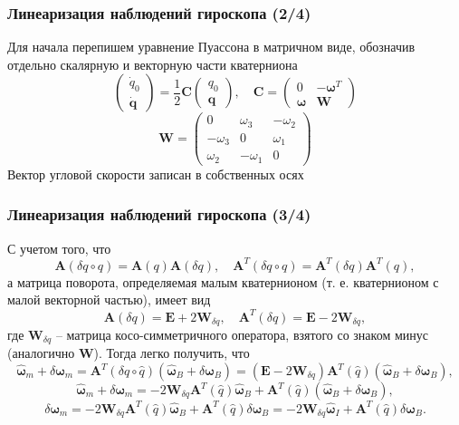 \documentclass[utf8]{beamer}
\begin{document}
\begin{frame}
    \frametitle{Линеаризация наблюдений гироскопа (2/4)}
Для начала перепишем уравнение Пуассона в матричном виде, обозначив отдельно
скалярную и векторную части кватерниона
$$
\left(
\begin{array}{c}
    \dot{q}_0 \\
    \dot{\mathbf{q}}
\end{array}
\right) = \frac{1}{2}\mathbf{C}
\left(
\begin{array}{c}
    {q}_0 \\
    {\mathbf{q}}
\end{array}
\right),
\quad
\mathbf{C} = \left(\begin{array}{cc}
0 & -\mathbf{\omega}^T \\
\mathbf{\omega} & \mathbf{W} 
\end{array}\right)
$$
$$
\mathbf{W} = \left(\begin{array}{rrr}
        0 & \omega_3 & -\omega_2 \\
        -\omega_3 & 0 & \omega_1 \\
        \omega_2 & -\omega_1 & 0
\end{array}\right)
$$
Вектор угловой скорости записан в собственных осях
\end{frame}
\begin{frame}
    \frametitle{Линеаризация наблюдений гироскопа (3/4)}
С учетом того, что
$$
\mathbf{A}\left(\delta q \circ q\right) =
\mathbf{A}\left(q\right)\mathbf{A}\left(\delta q\right), \quad
\mathbf{A}^T\left(\delta q \circ q\right) =
\mathbf{A}^T\left(\delta q\right)\mathbf{A}^T\left(q\right),
$$
а матрица поворота, определяемая малым кватернионом (т. е. кватернионом с
малой векторной частью), имеет вид
$$
\mathbf{A}\left(\delta q\right) = \mathbf{E} + 2\mathbf{W}_{\delta q},\quad
\mathbf{A}^T\left(\delta q\right) = \mathbf{E} - 2\mathbf{W}_{\delta q},
$$
где $\mathbf{W}_{\delta q}$ -- матрица косо-симметричного оператора, взятого со
знаком минус (аналогично $\mathbf{W}$). Тогда легко получить, что 
$$
\hat{\mathbf{\omega}}_m +\delta \mathbf{\omega}_m = \mathbf{A}^T\left(\delta q \circ
\hat{q}\right)\left(\hat{\mathbf{\omega}}_B + \delta \mathbf{\omega}_B\right) = 
\left(\mathbf{E} - 2\mathbf{W}_{\delta q}\right)\mathbf{A}^T\left(\hat{q}\right)
\left(\hat{\mathbf{\omega}}_B + \delta\mathbf{\omega}_B\right),
$$
$$
\hat{\mathbf{\omega}}_m +\delta \mathbf{\omega}_m = 
-2\mathbf{W}_{\delta q}\mathbf{A}^T\left(\hat{q}\right)\hat{\mathbf{\omega}}_B + 
\mathbf{A}^T\left(\hat{q}\right)
\left(\hat{\mathbf{\omega}}_B + \delta\mathbf{\omega}_B\right),
$$
$$
\delta \mathbf{\omega}_m = 
-2\mathbf{W}_{\delta q}\mathbf{A}^T\left(\hat{q}\right)\hat{\mathbf{\omega}}_B + 
\mathbf{A}^T\left(\hat{q}\right)\delta\mathbf{\omega}_B = 
-2\mathbf{W}_{\delta q}\hat{\mathbf{\omega}}_I + 
\mathbf{A}^T\left(\hat{q}\right)\delta\mathbf{\omega}_B.
$$
\end{frame}
\end{document}
